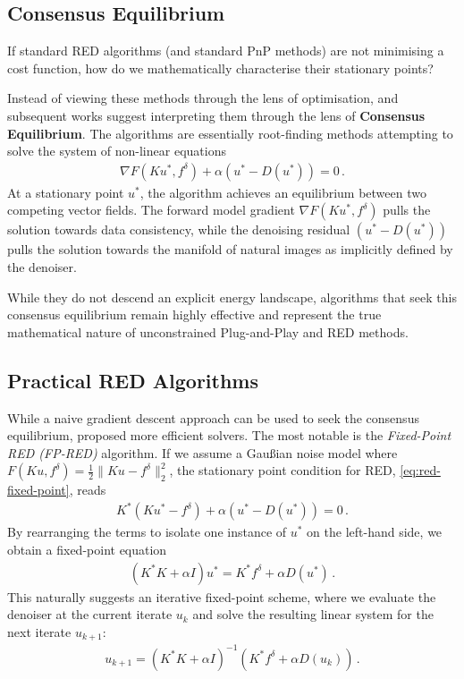 \subsection{Consensus Equilibrium}
If standard RED algorithms (and standard PnP methods) are not minimising a cost function, how do we mathematically characterise their stationary points?

Instead of viewing these methods through the lens of optimisation, \cite{reehorst2018regularization} and subsequent works suggest interpreting them through the lens of \textbf{Consensus Equilibrium}. The algorithms are essentially root-finding methods attempting to solve the system of non-linear equations
\begin{align}
    \nabla F(Ku^*, f^\delta) + \alpha (u^* - D(u^*)) = 0 \, .\label{eq:red-fixed-point}
\end{align}
At a stationary point $u^*$, the algorithm achieves an equilibrium between two competing vector fields. The forward model gradient $\nabla F(Ku^*, f^\delta)$ pulls the solution towards data consistency, while the denoising residual $(u^* - D(u^*))$ pulls the solution towards the manifold of natural images as implicitly defined by the denoiser. 

While they do not descend an explicit energy landscape, algorithms that seek this consensus equilibrium remain highly effective and represent the true mathematical nature of unconstrained Plug-and-Play and RED methods.

\subsection{Practical RED Algorithms}
\label{sec:red_algorithms}

While a naive gradient descent approach can be used to seek the consensus equilibrium, \cite{romano2017little} proposed more efficient solvers. The most notable is the \emph{Fixed-Point RED (FP-RED)} algorithm. If we assume a Gau\ss ian noise model where $F(Ku, f^\delta) = \frac{1}{2}\|Ku - f^\delta\|_2^2$, the stationary point condition for RED, \eqref{eq:red-fixed-point}, reads
\begin{align}
    K^*(Ku^* - f^\delta) + \alpha (u^* - D(u^*)) = 0 \, .
\end{align}
By rearranging the terms to isolate one instance of $u^*$ on the left-hand side, we obtain a fixed-point equation
\begin{align}
    (K^*K + \alpha I) u^* = K^* f^\delta + \alpha D(u^*) \, .
\end{align}
This naturally suggests an iterative fixed-point scheme, where we evaluate the denoiser at the current iterate $u_k$ and solve the resulting linear system for the next iterate $u_{k+1}$:
\begin{align}
    u_{k+1} = (K^*K + \alpha I)^{-1} \left( K^* f^\delta + \alpha D(u_k) \right) \, .
    \label{eq:fp_red}
\end{align}

